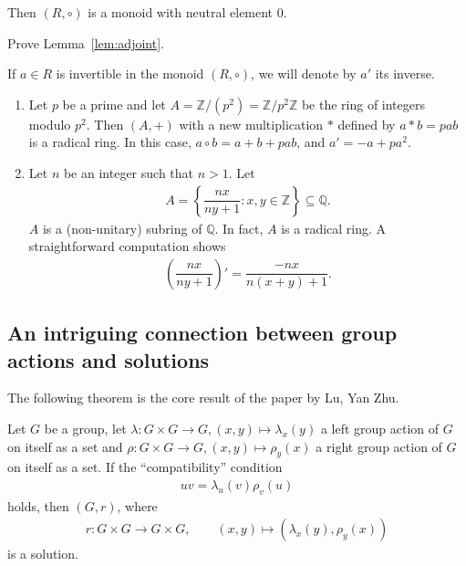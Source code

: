     \begin{lemma}\label{lem:adjoint}
        Then $(R,\circ)$ is a monoid with neutral element $0$. 
    \end{lemma}

    \begin{exercise}
        Prove Lemma~\ref{lem:adjoint}.
    \end{exercise}

    \begin{convention}
        If $a\in R$ is invertible in the monoid $(R, \circ)$, 
        we will denote by $a'$ its inverse.
    \end{convention}

    \begin{examples}\mbox{}
        \begin{enumerate}
            \item Let $p$ be a prime and let $A = \mathbb{Z}/(p^2) = \mathbb{Z}/p^2\mathbb{Z}$ be the ring of integers modulo $p^2$. Then $(A,+)$ with a new multiplication $\ast$ defined by $a\ast b = pab$ is a radical ring. In this case, $a\circ b = a+b+pab$, and $a' =-a+pa^2$. 
            \item Let $n$ be an integer such that $n>1$. Let 
                \begin{align*}
                    A=\left\{\dfrac{nx}{ny+1}\colon x,y \in \mathbb{Z}\right\}\subseteq \mathbb{Q}.
                \end{align*}
                $A$ is a (non-unitary) subring of $\mathbb{Q}$. In fact, $A$ is a radical ring. A straightforward computation shows
                \begin{align*}
                    \left(\dfrac{nx}{ny+1}\right)' = \dfrac{-nx}{n(x+y)+1}.
                \end{align*}
        \end{enumerate}
    \end{examples}


    \subsection{An intriguing connection between group actions and solutions}
    The following theorem is the core result of the paper \cite{LYZ00} by Lu, Yan Zhu.

    \begin{theorem}\label{thm:LYZ}
         Let $G$ be a group, let $\lambda: G\times G \to G, (x,y)\mapsto \lambda_x(y)$ a left group action of $G$ on itself as a set and $\rho: G\times G \to G, (x,y)\mapsto \rho_y(x)$ a right group action of $G$ on itself as a set. If the ``compatibility'' condition 
        \begin{align}\label{eq:LYZ}
            uv = \lambda_u(v)\rho_v(u)
        \end{align}
        holds, then $(G,r)$, where
        \begin{align*}
            r:G\times G \to G\times G, \qquad (x,y)\mapsto (\lambda_x(y),\rho_y(x))
        \end{align*}
        is a solution.
    \end{theorem}

